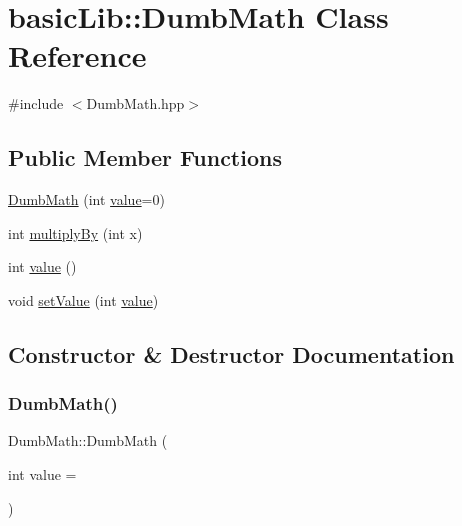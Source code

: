 \hypertarget{classbasicLib_1_1DumbMath}{}\section{basic\+Lib\+:\+:Dumb\+Math Class Reference}
\label{classbasicLib_1_1DumbMath}


{\ttfamily \#include $<$Dumb\+Math.\+hpp$>$}

\subsection*{Public Member Functions}
\begin{DoxyCompactItemize}
\item 
\hyperlink{classbasicLib_1_1DumbMath_a7c01975ee34d3783b3517243becc7179}{Dumb\+Math} (int \hyperlink{classbasicLib_1_1DumbMath_aa2e0180126b6f246d28da2d224f151b1}{value}=0)
\item 
int \hyperlink{classbasicLib_1_1DumbMath_a259a29619fe7b9f3609608e2d764e51b}{multiply\+By} (int x)
\item 
int \hyperlink{classbasicLib_1_1DumbMath_aa2e0180126b6f246d28da2d224f151b1}{value} ()
\item 
void \hyperlink{classbasicLib_1_1DumbMath_aae5e0d45c7487f89bd49e6d84e0a9356}{set\+Value} (int \hyperlink{classbasicLib_1_1DumbMath_aa2e0180126b6f246d28da2d224f151b1}{value})
\end{DoxyCompactItemize}


\subsection{Constructor \& Destructor Documentation}
\mbox{\label{classbasicLib_1_1DumbMath_a7c01975ee34d3783b3517243becc7179}} 
\subsubsection{\texorpdfstring{Dumb\+Math()}{DumbMath()}}
{\footnotesize\ttfamily Dumb\+Math\+::\+Dumb\+Math (\begin{DoxyParamCaption}\item[{int}]{value = {} }\end{DoxyParamCaption})}



